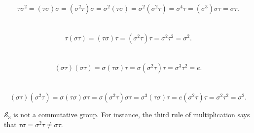 \documentclass[
  coursecode={MTHE 418},
  assignmentname={Homework \homeworknumber},
  studentnumber=20053722,
  name={Bryan Hoang},
  draft,
  final,
]{
  ltxanswer%
}
\begin{document}
  \begin{questions}
    \setcounter{question}{\questionnumber}
    \addtocounter{question}{-1}
    \question[10]\
    \begin{parts}
      \part{}
      \begin{solution}
        \begin{equation*}
          \tau\sigma^{2} = (\tau\sigma)\sigma = (\sigma^{2}\tau)\sigma = \sigma^{2}(\tau\sigma) = \sigma^{2}(\sigma^{2}\tau) = \sigma^{4}\tau = (\sigma^{3})\sigma\tau = \boxed{\sigma\tau}.
        \end{equation*}
      \end{solution}

      \part{}
      \begin{solution}
        \begin{equation*}
          \tau(\sigma\tau) = (\tau\sigma)\tau = (\sigma^{2}\tau)\tau = \sigma^{2}\tau^{2} = \boxed{\sigma^{2}}.
        \end{equation*}
      \end{solution}

      \part{}
      \begin{solution}
        \begin{equation*}
          (\sigma\tau)(\sigma\tau) = \sigma(\tau\sigma)\tau = \sigma(\sigma^{2}\tau)\tau = \sigma^{3}\tau^{2} = \boxed{e}.
        \end{equation*}
      \end{solution}

      \part{}
      \begin{solution}
        \begin{equation*}
          (\sigma\tau)(\sigma^{2}\tau) = \sigma(\tau\sigma)\sigma\tau = \sigma(\sigma^{2}\tau)\sigma\tau = \sigma^{3}(\tau\sigma)\tau = e(\sigma^{2}\tau)\tau = \sigma^{2}\tau^{2} = \boxed{\sigma^{2}}.
        \end{equation*}
      \end{solution}
    \end{parts}

    \begin{solution}
      \(\mathcal{S}_{3}\) is not a commutative group. For instance, the third rule of multiplication says that \(\tau\sigma=\sigma^{2}\tau\ne\sigma\tau\).
    \end{solution}
  \end{questions}
\end{document}
